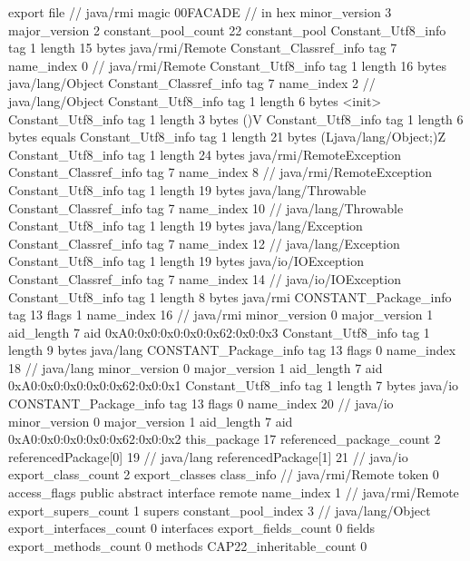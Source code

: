 export file {		// java/rmi
	magic	00FACADE		 // in hex
	minor_version	3
	major_version	2
	constant_pool_count	22
	constant_pool {
		Constant_Utf8_info {
			tag	1
			length	15
			bytes	java/rmi/Remote
		}
		Constant_Classref_info {
			tag	7
			name_index	0		// java/rmi/Remote
		}
		Constant_Utf8_info {
			tag	1
			length	16
			bytes	java/lang/Object
		}
		Constant_Classref_info {
			tag	7
			name_index	2		// java/lang/Object
		}
		Constant_Utf8_info {
			tag	1
			length	6
			bytes	<init>
		}
		Constant_Utf8_info {
			tag	1
			length	3
			bytes	()V
		}
		Constant_Utf8_info {
			tag	1
			length	6
			bytes	equals
		}
		Constant_Utf8_info {
			tag	1
			length	21
			bytes	(Ljava/lang/Object;)Z
		}
		Constant_Utf8_info {
			tag	1
			length	24
			bytes	java/rmi/RemoteException
		}
		Constant_Classref_info {
			tag	7
			name_index	8		// java/rmi/RemoteException
		}
		Constant_Utf8_info {
			tag	1
			length	19
			bytes	java/lang/Throwable
		}
		Constant_Classref_info {
			tag	7
			name_index	10		// java/lang/Throwable
		}
		Constant_Utf8_info {
			tag	1
			length	19
			bytes	java/lang/Exception
		}
		Constant_Classref_info {
			tag	7
			name_index	12		// java/lang/Exception
		}
		Constant_Utf8_info {
			tag	1
			length	19
			bytes	java/io/IOException
		}
		Constant_Classref_info {
			tag	7
			name_index	14		// java/io/IOException
		}
		Constant_Utf8_info {
			tag	1
			length	8
			bytes	java/rmi
		}
		CONSTANT_Package_info {
			tag	13
			flags	1
			name_index	16		// java/rmi
			minor_version	0
			major_version	1
			aid_length	7
			aid	0xA0:0x0:0x0:0x0:0x62:0x0:0x3
		}
		Constant_Utf8_info {
			tag	1
			length	9
			bytes	java/lang
		}
		CONSTANT_Package_info {
			tag	13
			flags	0
			name_index	18		// java/lang
			minor_version	0
			major_version	1
			aid_length	7
			aid	0xA0:0x0:0x0:0x0:0x62:0x0:0x1
		}
		Constant_Utf8_info {
			tag	1
			length	7
			bytes	java/io
		}
		CONSTANT_Package_info {
			tag	13
			flags	0
			name_index	20		// java/io
			minor_version	0
			major_version	1
			aid_length	7
			aid	0xA0:0x0:0x0:0x0:0x62:0x0:0x2
		}
	}
	this_package	17
	referenced_package_count	2
	referencedPackage[0]	19		// java/lang
	referencedPackage[1]	21		// java/io
	export_class_count	2
	export_classes {
		class_info {		// java/rmi/Remote
			token	0
			access_flags	public abstract interface remote
			name_index	1		// java/rmi/Remote
			export_supers_count	1
			supers {
				constant_pool_index	3		// java/lang/Object
			}
			export_interfaces_count	0
			interfaces {
			}
			export_fields_count	0
			fields {
			}
			export_methods_count	0
			methods {
			}
			CAP22_inheritable_count	0
}}}
